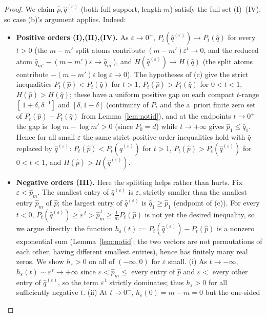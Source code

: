 \documentclass{amsart}
\theoremstyle{plain}
\theoremstyle{definition}
\begin{document}
\begin{proof}
We claim $\hat p,\hat q^{(\varepsilon)}$ (both full support, length $m$) satisfy the
full set (I)--(IV), so case (b)'s argument applies. Indeed:
\begin{itemize}
\item \textbf{Positive orders (I),(II),(IV).} As $\varepsilon\to0^+$,
$P_t(\hat q^{(\varepsilon)})\to P_t(\hat q)$ for every $t>0$ (the $m-m'$ split atoms
contribute $(m-m')\varepsilon^t\to0$, and the reduced atom
$\hat q_{m'}-(m-m')\varepsilon\to\hat q_{m'}$), and $H(\hat q^{(\varepsilon)})\to
H(\hat q)$ (the split atoms contribute $-(m-m')\varepsilon\log\varepsilon\to0$).
The hypotheses of (c) give the strict inequalities $P_t(\hat p)<P_t(\hat q)$ for $t>1$,
$P_t(\hat p)>P_t(\hat q)$ for $0<t<1$, $H(\hat p)>H(\hat q)$; these have a uniform
positive gap on each compact $t$-range $[\,1+\delta,\delta^{-1}]$ and
$[\delta,1-\delta]$ (continuity of $P_t$ and the a~priori finite zero set of
$P_t(\hat p)-P_t(\hat q)$ from Lemma~\ref{lem:notid}), and at the endpoints
$t\to0^+$ the gap is $\log m-\log m'>0$ (since $P_0=d$) while $t\to+\infty$ gives
$\hat p_1\le\hat q_1$. Hence for all small $\varepsilon$ the same strict positive-order
inequalities hold with $\hat q$ replaced by $\hat q^{(\varepsilon)}$:
$P_t(\hat p)<P_t(\hat q^{(\varepsilon)})$ for $t>1$,
$P_t(\hat p)>P_t(\hat q^{(\varepsilon)})$ for $0<t<1$, and
$H(\hat p)>H(\hat q^{(\varepsilon)})$.
\item \textbf{Negative orders (III).} Here the splitting helps rather than hurts. Fix
$\varepsilon<\hat p_m$. The smallest entry of $\hat q^{(\varepsilon)}$ is $\varepsilon$,
strictly smaller than the smallest entry $\hat p_m$ of $\hat p$; the largest entry of
$\hat q^{(\varepsilon)}$ is $\hat q_1\ge\hat p_1$ (endpoint of (c)). For every $t<0$,
$P_t(\hat q^{(\varepsilon)})\ge\varepsilon^{\,t}>\hat p_m^{\,t}\ge\frac{1}{m}P_t(\hat
p)$ is not yet the desired inequality, so we argue directly: the function
$h_\varepsilon(t):=P_t(\hat q^{(\varepsilon)})-P_t(\hat p)$ is a nonzero exponential
sum (Lemma~\ref{lem:notid}; the two vectors are not permutations of each other, having
different smallest entries), hence has finitely many real zeros. We show $h_\varepsilon
>0$ on all of $(-\infty,0)$ for $\varepsilon$ small. (i) As $t\to-\infty$,
$h_\varepsilon(t)\sim\varepsilon^{\,t}\to+\infty$ since $\varepsilon<\hat p_m\le$ every
entry of $\hat p$ and $\varepsilon<$ every other entry of $\hat q^{(\varepsilon)}$, so
the term $\varepsilon^{\,t}$ strictly dominates; thus $h_\varepsilon>0$ for all
sufficiently negative $t$. (ii) At $t\to0^-$, $h_\varepsilon(0)=m-m=0$ but the one-sided

\end{itemize}
\end{proof}
\end{document}
